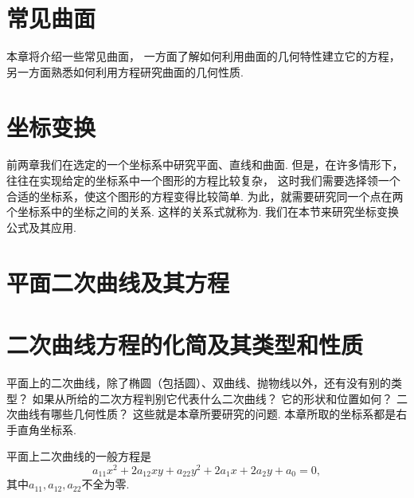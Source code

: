 \chapter{常见曲面}
本章将介绍一些常见曲面，
一方面了解如何利用曲面的几何特性建立它的方程，
另一方面熟悉如何利用方程研究曲面的几何性质.







\chapter{坐标变换}
前两章我们在选定的一个坐标系中研究平面、直线和曲面.
但是，在许多情形下，往往在实现给定的坐标系中一个图形的方程比较复杂，
这时我们需要选择领一个合适的坐标系，使这个图形的方程变得比较简单.
为此，就需要研究同一个点在两个坐标系中的坐标之间的关系.
这样的关系式就称为.
我们在本节来研究坐标变换公式及其应用.







\chapter{平面二次曲线及其方程}





\chapter{二次曲线方程的化简及其类型和性质}
\begingroup
平面上的二次曲线，除了椭圆（包括圆）、双曲线、抛物线以外，还有没有别的类型？
如果从所给的二次方程判别它代表什么二次曲线？
它的形状和位置如何？
二次曲线有哪些几何性质？
这些就是本章所要研究的问题.
本章所取的坐标系都是右手直角坐标系.

平面上二次曲线的一般方程是\begin{equation}\label{equation:二次曲线方程.平面二次曲线的一般方程}
	a_{11} x^2 + 2 a_{12} x y + a_{22} y^2
	+ 2 a_1 x + 2 a_2 y + a_0 = 0,
\end{equation}
其中\(a_{11},a_{12},a_{22}\)不全为零.

